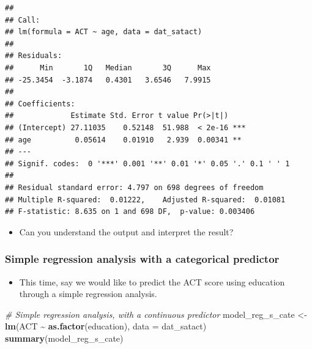 \documentclass[
]{book}
\newenvironment{Shaded}{\begin{snugshade}}{\end{snugshade}}
\newcommand{\AttributeTok}[1]{\textcolor[rgb]{0.13,0.29,0.53}{#1}}
\newcommand{\CommentTok}[1]{\textcolor[rgb]{0.56,0.35,0.01}{\textit{#1}}}
\newcommand{\FunctionTok}[1]{\textcolor[rgb]{0.13,0.29,0.53}{\textbf{#1}}}
\newcommand{\NormalTok}[1]{#1}
\newcommand{\OtherTok}[1]{\textcolor[rgb]{0.56,0.35,0.01}{#1}}
\newcommand{\SpecialCharTok}[1]{\textcolor[rgb]{0.81,0.36,0.00}{\textbf{#1}}}
\providecommand{\tightlist}{%
  \setlength{\itemsep}{0pt}\setlength{\parskip}{0pt}}
\begin{document}
\begin{verbatim}
## 
## Call:
## lm(formula = ACT ~ age, data = dat_satact)
## 
## Residuals:
##      Min       1Q   Median       3Q      Max 
## -25.3454  -3.1874   0.4301   3.6546   7.9915 
## 
## Coefficients:
##             Estimate Std. Error t value Pr(>|t|)    
## (Intercept) 27.11035    0.52148  51.988  < 2e-16 ***
## age          0.05614    0.01910   2.939  0.00341 ** 
## ---
## Signif. codes:  0 '***' 0.001 '**' 0.01 '*' 0.05 '.' 0.1 ' ' 1
## 
## Residual standard error: 4.797 on 698 degrees of freedom
## Multiple R-squared:  0.01222,    Adjusted R-squared:  0.01081 
## F-statistic: 8.635 on 1 and 698 DF,  p-value: 0.003406
\end{verbatim}

\begin{itemize}
\tightlist
\item
  Can you understand the output and interpret the result?
\end{itemize}

\subsubsection{Simple regression analysis with a categorical predictor}\label{simple-regression-analysis-with-a-categorical-predictor}

\begin{itemize}
\tightlist
\item
  This time, say we would like to predict the ACT score using education through a simple regression analysis.
\end{itemize}

\begin{Shaded}
\begin{Highlighting}[]
\CommentTok{\# Simple regression analysis, with a continuous predictor}
\NormalTok{model\_reg\_s\_cate }\OtherTok{\textless{}{-}} \FunctionTok{lm}\NormalTok{(ACT }\SpecialCharTok{\textasciitilde{}} \FunctionTok{as.factor}\NormalTok{(education), }\AttributeTok{data =}\NormalTok{ dat\_satact)}
\FunctionTok{summary}\NormalTok{(model\_reg\_s\_cate)}
\end{Highlighting}
\end{Shaded}
\end{document}
